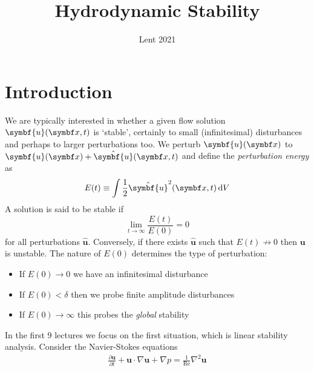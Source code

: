 \documentclass{jknotes}
\renewcommand{\u}{\symbf{u}}
\begin{document}
\title{Hydrodynamic Stability}
\date{Lent 2021}

\maketitle
\suggestionsspiel
\tableofcontents

\section{Introduction}
We are typically interested in whether a given flow solution $\u(\x,t)$ is
`stable', certainly to small (infinitesimal) disturbances and perhaps to
larger perturbations too. We perturb $\u(\x)$ to $\u(\x) + \hat{\u}(\x,t)$ and
define the \emph{perturbation energy} as
\begin{equation}
	E(t) \equiv \int \frac{1}{2}\hat{\u}^2(\x,t) \, \diffd V
\end{equation}
A solution is said to be stable if
\begin{equation}
	\lim_{t \to \infty} \frac{E(t)}{E(0)} = 0
\end{equation}
for all perturbations $\hat{\u}$. Conversely, if there exists $\hat{\u}$ such
that $E(t) \not\rightarrow 0$ then $\u$ is unstable. The nature of $E(0)$
determines the type of perturbation:
\begin{itemize}
	\item If $E(0) \to 0$ we have an infinitesimal disturbance
	\item If $E(0) < \delta$ then we probe finite amplitude disturbances
	\item If $E(0) \to \infty$ this probes the \emph{global} stability
\end{itemize}

In the first 9 lectures we focus on the first situation, which is linear
stability analysis. Consider the Navier-Stokes equations
\begin{align}
	\frac{\partial \u}{\partial t} + \u \cdot \nabla \u + \nabla p =
	\frac{1}{\text{Re}} \nabla^2 \u
\end{align}
\end{document}
